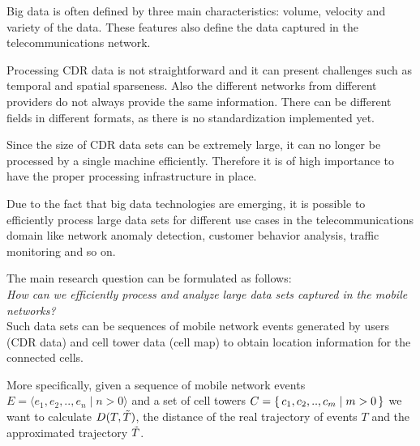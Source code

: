 Big data is often defined by three main characteristics: volume, velocity and variety of the data. These features also define the data captured in the telecommunications network.

Processing CDR data is not straightforward and it can present challenges such as temporal and spatial sparseness. Also the different networks from different providers do not always provide the same information. There can be different fields in different formats, as there is no standardization implemented yet. 

Since the size of CDR data sets can be extremely large, it can no longer be processed by a single machine efficiently. Therefore it is of high importance to have the proper processing infrastructure in place.  

Due to the fact that big data technologies are emerging, it is possible to efficiently process large data sets for different use cases in the telecommunications domain like network anomaly detection, customer behavior analysis, traffic monitoring and so on.

The main research question can be formulated as follows:\\

\textit{How can we efficiently process and analyze large data sets captured in the mobile networks?}\\

Such data sets can be sequences of mobile network events generated by users (CDR data) and cell tower data (cell map) to obtain location information for the connected cells.

More specifically, given a sequence of mobile network events $E = \langle e_{1}, e_{2}, .., e_{n} \mid n > 0 \rangle$ and a set of cell towers $C = \set{c_{1}, c_{2}, .., c_{m} \mid m > 0}$ we want to calculate $D(T,\Tilde{T})$, the distance of the real trajectory of events $T$ and the approximated trajectory $\Tilde{T}$.






